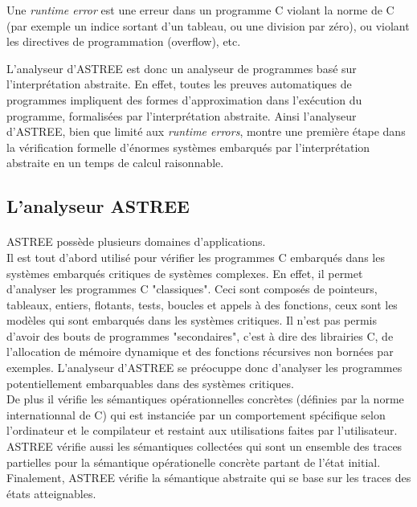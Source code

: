 \documentclass[french]{report}
\begin{document}
Une \textit{runtime error} est une erreur dans un programme C violant la norme de C (par exemple un indice sortant
d'un tableau, ou une division par zéro), ou violant les directives de programmation (overflow), etc.

L'analyseur d'ASTREE est donc un analyseur de programmes basé sur l'interprétation abstraite. En effet, toutes les preuves
automatiques de programmes impliquent des formes d'approximation dans l'exécution du programme, formalisées par
l'interprétation abstraite.
Ainsi l'analyseur d'ASTREE, bien que limité aux \textit{runtime errors}, montre une première étape
dans la vérification formelle d'énormes systèmes embarqués par l'interprétation abstraite en un temps de calcul
raisonnable.

\subsection{L'analyseur ASTREE}

\paragraph{}
ASTREE possède plusieurs domaines d'applications. \\
Il est tout d'abord utilisé pour vérifier les programmes C embarqués dans les systèmes embarqués critiques
de systèmes complexes. En effet, il permet d'analyser les programmes C "classiques". Ceci sont composés de pointeurs,
tableaux, entiers, flotants, tests, boucles et appels à des fonctions, ceux sont les modèles qui sont embarqués dans les
systèmes critiques. Il n'est pas permis d'avoir des bouts de programmes "secondaires", c'est à dire des librairies C,
de l'allocation de mémoire dynamique et des fonctions récursives non bornées par exemples. L'analyseur d'ASTREE se
préocuppe donc d'analyser les programmes potentiellement embarquables dans des systèmes critiques. \\
De plus il vérifie les sémantiques opérationnelles concrètes (définies par la norme internationnal de C) qui
est instanciée par un comportement spécifique selon l'ordinateur et le compilateur et restaint aux utilisations faites par
l'utilisateur.
ASTREE vérifie aussi les sémantiques collectées qui sont un ensemble des traces partielles pour
la sémantique opérationelle concrète partant de l'état initial. Finalement, ASTREE vérifie la sémantique abstraite
qui se base sur les traces des états atteignables.
\end{document}
